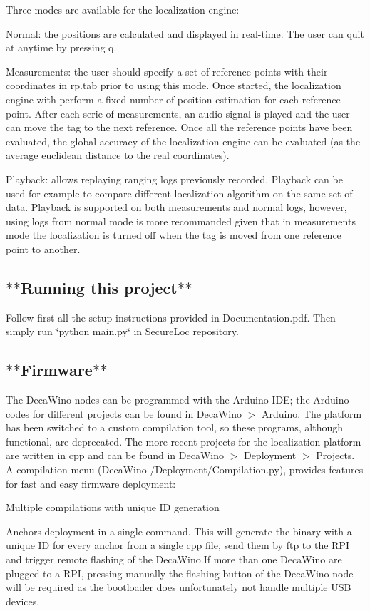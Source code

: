Three modes are available for the localization engine\+:
\begin{DoxyItemize}
\item Normal\+: the positions are calculated and displayed in real-\/time. The user can quit at anytime by pressing \textquotesingle{}q\textquotesingle{}.
\item Measurements\+: the user should specify a set of reference points with their coordinates in rp.\+tab prior to using this mode. Once started, the localization engine with perform a fixed number of position estimation for each reference point. After each serie of measurements, an audio signal is played and the user can move the tag to the next reference. Once all the reference points have been evaluated, the global accuracy of the localization engine can be evaluated (as the average euclidean distance to the real coordinates).
\item Playback\+: allows replaying ranging logs previously recorded. Playback can be used for example to compare different localization algorithm on the same set of data. Playback is supported on both measurements and normal logs, however, using logs from normal mode is more recommanded given that in measurements mode the localization is turned off when the tag is moved from one reference point to another.
\end{DoxyItemize}

\subsection*{$\ast$$\ast$\+Running this project$\ast$$\ast$}

Follow first all the setup instructions provided in Documentation.\+pdf. Then simply run \char`\"{}python main.\+py\char`\"{} in Secure\+Loc repository.

\subsection*{$\ast$$\ast$\+Firmware$\ast$$\ast$}

The Deca\+Wino nodes can be programmed with the Arduino I\+DE; the Arduino codes for different projects can be found in Deca\+Wino $>$ Arduino. The platform has been switched to a custom compilation tool, so these programs, although functional, are deprecated. The more recent projects for the localization platform are written in cpp and can be found in Deca\+Wino $>$ Deployment $>$ Projects. A compilation menu (Deca\+Wino /\+Deployment/\+Compilation.py), provides features for fast and easy firmware deployment\+:
\begin{DoxyItemize}
\item Multiple compilations with unique ID generation
\item Anchors deployment in a single command. This will generate the binary with a unique ID for every anchor from a single cpp file, send them by ftp to the R\+PI and trigger remote flashing of the Deca\+Wino.\+If more than one Deca\+Wino are plugged to a R\+PI, pressing manually the flashing button of the Deca\+Wino node will be required as the bootloader does unfortunately not handle multiple U\+SB devices.
\end{DoxyItemize}

